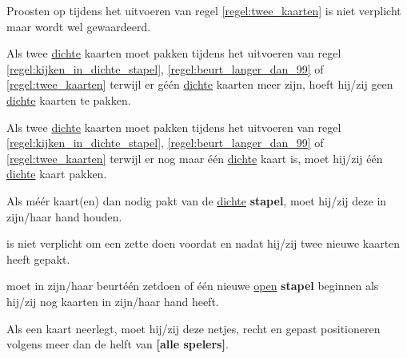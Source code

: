 \vervolgLijst{}
    \item Proosten op  tijdens het uitvoeren van regel \ref{regel:twee_kaarten} is niet verplicht maar wordt wel gewaardeerd.
\eindLijst{}

\vervolgLijst{}
    \item Als \eenSpeler twee \ul{dichte} kaarten moet pakken tijdens het uitvoeren van regel \ref{regel:kijken_in_dichte_stapel}, \ref{regel:beurt_langer_dan_99} of \ref{regel:twee_kaarten} terwijl er g\'e\'en \ul{dichte} kaarten meer zijn, hoeft hij/zij geen \ul{dichte} kaarten te pakken.
    \label{item:geen_kaart_1}
\eindLijst{}

\vervolgLijst{}
    \item Als \eenSpeler twee \ul{dichte} kaarten moet pakken tijdens het uitvoeren van regel \ref{regel:kijken_in_dichte_stapel}, \ref{regel:beurt_langer_dan_99} of \ref{regel:twee_kaarten} terwijl er nog maar \'e\'en \ul{dichte} kaart is, moet hij/zij \'e\'en \ul{dichte} kaart pakken.
    \label{item:geen_kaart_2}
\eindLijst{}

\vervolgLijst{}
    \item Als \eenSpeler méér kaart(en) dan nodig pakt van de \ul{dichte} \textbf{stapel}, moet hij/zij deze in zijn/haar hand houden.
\eindLijst{}

\vervolgLijst{}
    \item \EenSpeler is niet verplicht om een zet\footnotemark[3] te doen voordat en nadat hij/zij twee nieuwe kaarten heeft gepakt.
\eindLijst{}

\vervolgLijst{}
    \item \EenSpeler moet in zijn/haar beurt\footnotemark[1] \'e\'en zet\footnotemark[3] doen of \'e\'en nieuwe \ul{open} \textbf{stapel} beginnen als hij/zij nog kaarten in zijn/haar hand heeft.
\eindLijst{}


\newpage
{}


\vervolgLijst{}
    \item Als \eenSpeler een kaart neerlegt, moet hij/zij deze netjes, recht en gepast positioneren volgens meer dan de helft van \textbf{[alle spelers]}.
    \label{regel:kaart_netjes_1}
\eindLijst{}

